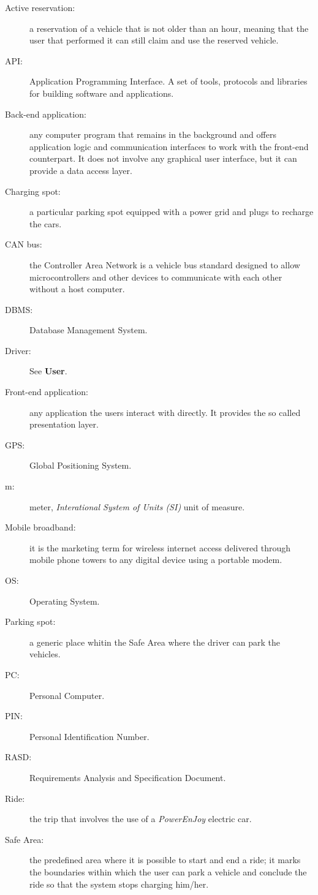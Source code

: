 \begin{description}
\item[Active reservation:] a reservation of a vehicle that is not older than an hour, meaning that the user that performed it can still claim and use the reserved vehicle.
\item[API:] Application Programming Interface. A set of tools, protocols and libraries for building software and applications.
\item[Back-end application:] any computer program that remains in the background and offers application logic and communication interfaces to work with the front-end counterpart. It does not involve any graphical user interface, but it can provide a data access layer.
\item[Charging spot:] a particular parking spot equipped with a power grid and plugs to recharge the cars.
\item[CAN bus:] the Controller Area Network is a vehicle bus standard designed to allow microcontrollers and other devices to communicate with each other without a host computer.
\item[DBMS:] Database Management System.
\item[Driver:] See \textbf{User}.
\item[Front-end application:] any application the users interact with directly. It provides the so called presentation layer.
\item[GPS:] Global Positioning System.
\item[m:] meter, \emph{Interational System of Units (SI)} unit of measure.
\item[Mobile broadband:] it is the marketing term for wireless internet access delivered through mobile phone towers to any digital device using a portable modem.
\item[OS:] Operating System.
\item[Parking spot:] a generic place whitin the Safe Area where the driver can park the vehicles.
\item[PC:] Personal Computer.
\item[PIN:] Personal Identification Number.
\item[RASD:] Requirements Analysis and Specification Document.
\item[Ride:] the trip that involves the use of a \emph{PowerEnJoy} electric car.
\item[Safe Area:] the predefined area where it is possible to start and end a ride; it marks the boundaries within which the user can park a vehicle and conclude the ride so that the system stops charging him/her.

\end{description}
